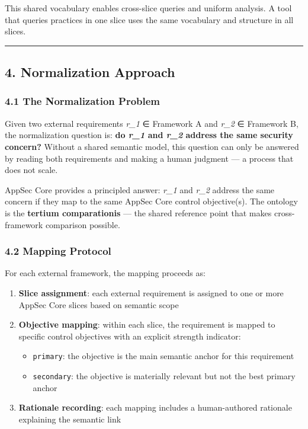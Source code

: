\documentclass[
]{article}
\providecommand{\tightlist}{%
  \setlength{\itemsep}{0pt}\setlength{\parskip}{0pt}}
\begin{document}
This shared vocabulary enables cross-slice queries and uniform analysis.
A tool that queries practices in one slice uses the same vocabulary and
structure in all slices.

\begin{center}\rule{0.5\linewidth}{0.5pt}\end{center}

\subsection{4. Normalization Approach}\label{normalization-approach}

\subsubsection{4.1 The Normalization
Problem}\label{the-normalization-problem}

Given two external requirements \emph{r\_1} ∈ Framework A and
\emph{r\_2} ∈ Framework B, the normalization question is: \textbf{do
\emph{r\_1} and \emph{r\_2} address the same security concern?} Without
a shared semantic model, this question can only be answered by reading
both requirements and making a human judgment --- a process that does
not scale.

AppSec Core provides a principled answer: \emph{r\_1} and \emph{r\_2}
address the same concern if they map to the same AppSec Core control
objective(s). The ontology is the \textbf{tertium comparationis} --- the
shared reference point that makes cross-framework comparison possible.

\subsubsection{4.2 Mapping Protocol}\label{mapping-protocol}

For each external framework, the mapping proceeds as:

\begin{enumerate}
\def\labelenumi{\arabic{enumi}.}
\tightlist
\item
  \textbf{Slice assignment}: each external requirement is assigned to
  one or more AppSec Core slices based on semantic scope
\item
  \textbf{Objective mapping}: within each slice, the requirement is
  mapped to specific control objectives with an explicit strength
  indicator:

  \begin{itemize}
  \tightlist
  \item
    \texttt{primary}: the objective is the main semantic anchor for this
    requirement
  \item
    \texttt{secondary}: the objective is materially relevant but not the
    best primary anchor
  \end{itemize}
\item
  \textbf{Rationale recording}: each mapping includes a human-authored
  rationale explaining the semantic link
\end{enumerate}
\end{document}
